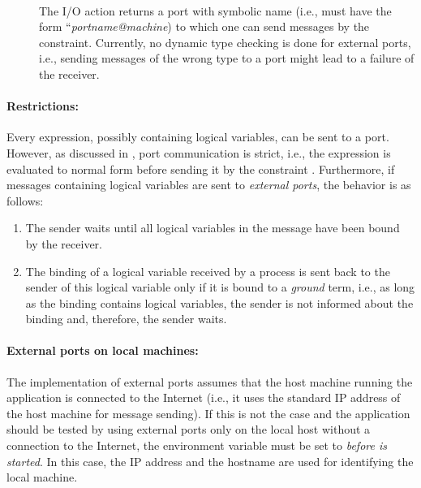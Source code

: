 {\begin{description}
\item[]~\\
The I/O action 
returns a port with symbolic name
 (i.e.,  must have the form ``\emph{portname@machine})
to which one can send messages by the  constraint.
Currently, no dynamic type checking is done for external ports,
i.e., sending messages of the wrong type to a port might lead to
a failure of the receiver.
\end{description}

\paragraph{Restrictions:}
Every expression, possibly containing logical variables, can be sent to
a port. However, as discussed in \cite{Hanus99PPDP},
port communication is strict, i.e., the expression is
evaluated to normal form before sending it by the
constraint . Furthermore, if messages containing
logical variables are sent to \emph{external ports},
the behavior is as follows:
\begin{enumerate}
\item The sender waits until all logical variables in the message
have been bound by the receiver.
\item The binding of a logical variable received by a process
is sent back to the sender of this logical variable only if
it is bound to a \emph{ground} term, i.e., as long as the binding contains
logical variables, the sender is not informed about the binding
and, therefore, the sender waits.
\end{enumerate}

\paragraph{External ports on local machines:}
The implementation of external ports assumes that the
host machine running the application is connected to the Internet
(i.e., it uses the standard IP address of the host machine
for message sending). If this is not the case and the application
should be tested by using external ports only on the local host
without a connection to the Internet,
the environment variable 
must be set to 
\emph{before \CYS is started}.
In this case, the IP address  and the hostname
 are used for identifying the local machine.

}
